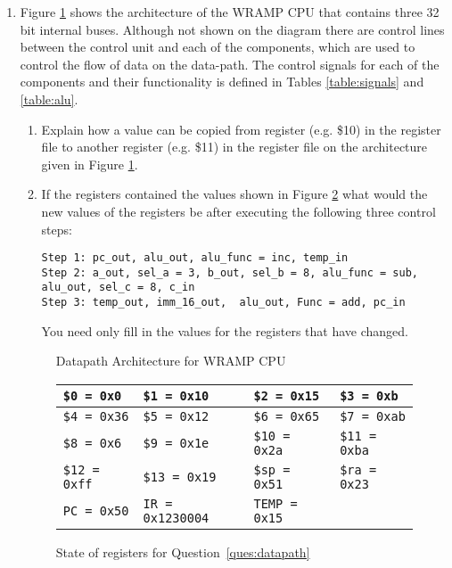 \documentclass[a4paper,10pt]{article}
\begin{document}
\begin{enumerate}
\newpage

\item 
\label{ques:datapath}

Figure \ref{fig:wrampblok} shows the architecture of the WRAMP
CPU that contains three 32 bit internal buses. Although not shown on
the diagram there are control lines between the control unit and each
of the components, which are used to control the flow of data on the
data-path. The control signals for each of the components and their
functionality is defined in Tables \ref{table:signals} and
\ref{table:alu}.

\begin{enumerate}
 \item Explain how a value can be copied from register (e.g. \$10) in
   the register file to another register (e.g. \$11) in the register
   file on the architecture given in Figure \ref{fig:wrampblok}.

  \item If the registers contained the values shown in Figure
  \ref{fig:wrampreg} what would the new values of the registers be
  after executing the following three control steps:
{\small
\begin{verbatim}
Step 1: pc_out, alu_out, alu_func = inc, temp_in
Step 2: a_out, sel_a = 3, b_out, sel_b = 8, alu_func = sub, alu_out, sel_c = 8, c_in
Step 3: temp_out, imm_16_out,  alu_out, Func = add, pc_in
\end{verbatim}
}
	You need only fill in the values for the registers that have changed. 

\end{enumerate}

\begin{figure}[h]
\begin{center}
    \caption{Datapath Architecture for WRAMP CPU}
    \label{fig:wrampblok}
  \end{center}
\end{figure}

\begin{figure}[h]
\begin{center}
\begin{tabular}{|l|l|l|l|}
\hline
\verb+$0 = 0x0+ & \verb+$1 = 0x10+ & \verb+$2 = 0x15+ & \verb+$3 = 0xb+
\\
\hline
\verb+$4 = 0x36+ & \verb+$5 = 0x12+ & \verb+$6 = 0x65+ & \verb+$7 = 0xab+
\\
\hline
\verb+$8 = 0x6+ & \verb+$9 = 0x1e+ & \verb+$10 = 0x2a+ & \verb+$11 = 0xba+
\\
\hline
\verb+$12 = 0xff+ & \verb+$13 = 0x19+ & \verb+$sp = 0x51+ & \verb+$ra = 0x23+
\\
\hline
\verb+PC = 0x50+ & \verb+IR = 0x1230004+ & \verb+TEMP = 0x15+ & \\
\hline
\end{tabular}
\end{center}
\caption{State of registers for Question~\ref{ques:datapath}}
\label{fig:wrampreg}
\end{figure}

\end{enumerate}
\end{document}
